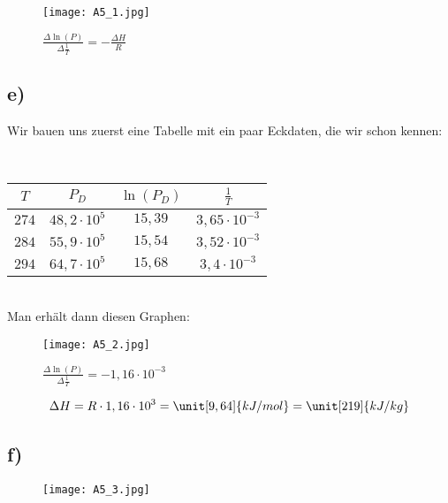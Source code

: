 \begin{figure}[h]
	\centering
	\texttt{[image: A5\_1.jpg]}
	\caption{$\frac{\Delta \ln(P)}{\Delta \frac{1}{T}} = - \frac{\Delta H}{R}$}
\end{figure}


\newpage

\subsection*{e)}

Wir bauen uns zuerst eine Tabelle mit ein paar Eckdaten, die wir schon kennen:

\hfil \\

\begin{center}
	\begin{tabular}{|c|c|c|c|}
		$T$ & $P_D$ & $\ln(P_D)$ & $\frac{1}{T}$ \\ 
		\hline
		$274$ & $48,2 \cdot 10^5$ & $15,39$ & $3,65 \cdot 10^{-3}$ \\ 
		$284$ & $55,9 \cdot 10^5$ & $15,54$ & $3,52 \cdot 10^{-3}$ \\ 
		$294$ & $64,7 \cdot 10^5$ & $15,68$ & $3,4 \cdot 10^{-3}$ \\ 
	\end{tabular} 
\end{center}

\hfil \\

Man erhält dann diesen Graphen:

\begin{figure}[h]
	\centering
	\texttt{[image: A5\_2.jpg]}
	\caption{$\frac{\Delta \ln(P)}{\Delta \frac{1}{T}} = -1,16 \cdot 10^{-3}$}
\end{figure}

\begin{align*}
\Delta H = R \cdot 1,16 \cdot 10^{3} = \unit[9,64]{kJ/mol} = \unit[219]{kJ/kg}
\end{align*}


\newpage


\subsection*{f)}

\begin{figure}[h]
	\centering
	\texttt{[image: A5\_3.jpg]}
	\caption{}
\end{figure}














